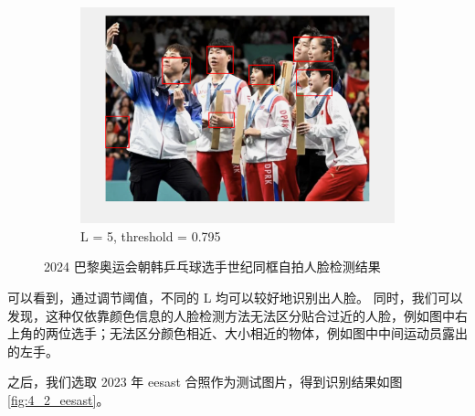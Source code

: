 \documentclass[a4paper]{article}  %
\begin{document}
\begin{figure}[ht]
\begin{subfigure}[b]{0.6\textwidth}
{        }\label{fig:4_2_tabletennis_L4}
    \end{subfigure}
    \vfill
    \begin{subfigure}[b]{0.6\textwidth}
        \centering
        \includegraphics[width=\textwidth]{asserts/4_2_tabletennis_L5.png}
        \caption{
            L = 5, threshold = 0.795
        }\label{fig:4_2_tabletennis_L5}
    \end{subfigure}
    \caption{
        2024 巴黎奥运会朝韩乒乓球选手世纪同框自拍人脸检测结果
    }\label{fig:4_2_tabletennis}
\end{figure}

可以看到，通过调节阈值，不同的 L 均可以较好地识别出人脸。
同时，我们可以发现，这种仅依靠颜色信息的人脸检测方法无法区分贴合过近的人脸，例如图中右上角的两位选手；无法区分颜色相近、大小相近的物体，例如图中中间运动员露出的左手。

之后，我们选取 2023 年 eesast 合照作为测试图片，得到识别结果如图 \ref{fig:4_2_eesast}。
\end{document}
